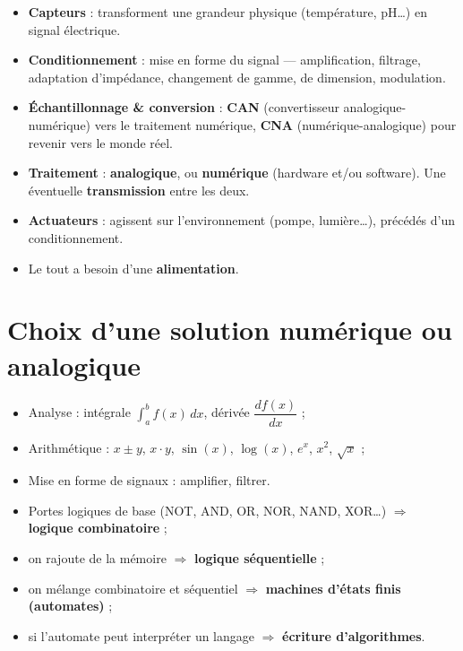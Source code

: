 \begin{defnbox}[title=Les blocs d'un système électronique]
\begin{itemize}
  \item \textbf{Capteurs} : transforment une grandeur physique (température, pH\ldots) en
        signal électrique.
  \item \textbf{Conditionnement} : mise en forme du signal --- amplification, filtrage,
        adaptation d'impédance, changement de gamme, de dimension, modulation.
  \item \textbf{Échantillonnage \& conversion} : \textbf{CAN} (convertisseur
        analogique-numérique) vers le traitement numérique, \textbf{CNA}
        (numérique-analogique) pour revenir vers le monde réel.
  \item \textbf{Traitement} : \textbf{analogique}, ou \textbf{numérique} (hardware et/ou
        software). Une éventuelle \textbf{transmission} entre les deux.
  \item \textbf{Actuateurs} : agissent sur l'environnement (pompe, lumière\ldots), précédés
        d'un conditionnement.
  \item Le tout a besoin d'une \textbf{alimentation}.
\end{itemize}
\end{defnbox}

\section{Choix d'une solution numérique ou analogique}


\begin{propbox}[title=Opérateurs analogiques]
\begin{itemize}
  \item Analyse : intégrale $\int_a^b f(x)\,dx$, dérivée $\dfrac{df(x)}{dx}$ ;
  \item Arithmétique : $x\pm y$, $x\cdot y$, $\sin(x)$, $\log(x)$, $e^x$, $x^2$, $\sqrt x$ ;
  \item Mise en forme de signaux : amplifier, filtrer.
\end{itemize}
\end{propbox}

\begin{propbox}[title=Opérateurs numériques]
\begin{itemize}
  \item Portes logiques de base (NOT, AND, OR, NOR, NAND, XOR\ldots) $\Rightarrow$
        \textbf{logique combinatoire} ;
  \item on rajoute de la mémoire $\Rightarrow$ \textbf{logique séquentielle} ;
  \item on mélange combinatoire et séquentiel $\Rightarrow$ \textbf{machines d'états finis
        (automates)} ;
  \item si l'automate peut interpréter un langage $\Rightarrow$ \textbf{écriture
        d'algorithmes}.
\end{itemize}
\end{propbox}

